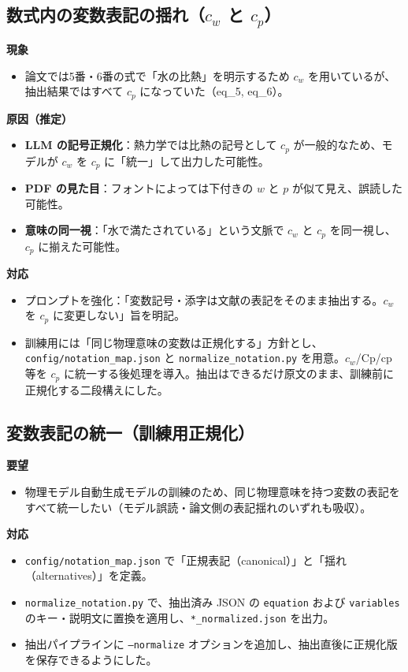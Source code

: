 \documentclass[11pt,a4paper]{jsarticle}
\begin{document}
\subsection{数式内の変数表記の揺れ（$c_w$ と $c_p$）}
\textbf{現象}
\begin{itemize}[nosep]
  \item 論文では5番・6番の式で「水の比熱」を明示するため $c_w$ を用いているが、抽出結果ではすべて $c_p$ になっていた（eq\_5, eq\_6）。
\end{itemize}

\textbf{原因（推定）}
\begin{itemize}[nosep]
  \item \textbf{LLM の記号正規化}：熱力学では比熱の記号として $c_p$ が一般的なため、モデルが $c_w$ を $c_p$ に「統一」して出力した可能性。
  \item \textbf{PDF の見た目}：フォントによっては下付きの $w$ と $p$ が似て見え、誤読した可能性。
  \item \textbf{意味の同一視}：「水で満たされている」という文脈で $c_w$ と $c_p$ を同一視し、$c_p$ に揃えた可能性。
\end{itemize}

\textbf{対応}
\begin{itemize}[nosep]
  \item プロンプトを強化：「変数記号・添字は文献の表記をそのまま抽出する。$c_w$ を $c_p$ に変更しない」旨を明記。
  \item 訓練用には「同じ物理意味の変数は正規化する」方針とし、\texttt{config/notation\_map.json} と \texttt{normalize\_notation.py} を用意。$c_w$/Cp/cp 等を $c_p$ に統一する後処理を導入。抽出はできるだけ原文のまま、訓練前に正規化する二段構えにした。
\end{itemize}

\subsection{変数表記の統一（訓練用正規化）}
\textbf{要望}
\begin{itemize}[nosep]
  \item 物理モデル自動生成モデルの訓練のため、同じ物理意味を持つ変数の表記をすべて統一したい（モデル誤読・論文側の表記揺れのいずれも吸収）。
\end{itemize}

\textbf{対応}
\begin{itemize}[nosep]
  \item \texttt{config/notation\_map.json} で「正規表記（canonical）」と「揺れ（alternatives）」を定義。
  \item \texttt{normalize\_notation.py} で、抽出済み JSON の \texttt{equation} および \texttt{variables} のキー・説明文に置換を適用し、\texttt{*\_normalized.json} を出力。
  \item 抽出パイプラインに \texttt{--normalize} オプションを追加し、抽出直後に正規化版を保存できるようにした。
\end{itemize}
\end{document}
